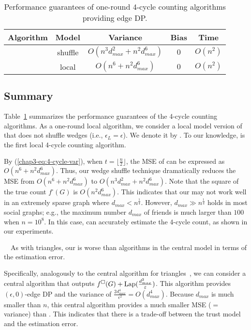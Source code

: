 \begin{table}[t]
  \caption{Performance guarantees of one-round 4-cycle counting algorithms providing edge DP.
  }
  
  \centering
  \begin{tabular}{|l|c|c|c|c|}
    \hline
    Algorithm & Model & Variance & Bias & Time \\ \hline
    \AlgWSCyc{} & shuffle & $O(n^3 d_{max}^2 + n^2 d_{max}^6)$ & $0$ & $O(n^2)$ \\ \hline
    \AlgWLCyc{} & local & $O(n^6 + n^2 d_{max}^6)$ & $0$ & $O(n^2)$ \\ \hline
  \end{tabular}
  \label{chap3-tab:upper_bounds_4cycle}
\end{table}

\subsection{Summary}
\label{chap3-sub:summary_4cycle}
Table~\ref{chap3-tab:upper_bounds_4cycle} summarizes the performance guarantees of the 4-cycle counting algorithms. 
As a one-round local algorithm, we consider a local model version of \AlgWSCyc{} that does not shuffle wedges (i.e., $\epsilon_L = \epsilon$). 
We denote it by \AlgWLCyc{}. 
To our knowledge, \AlgWLCyc{} is the first local 4-cycle counting algorithm. 

By (\ref{chap3-eq:4-cycle-var}), when $t = \lfloor \frac{n}{2} \rfloor$, the MSE of \AlgWLCyc{} can be expressed as $O(n^6 + n^2 d_{max}^6)$. 
Thus, our wedge shuffle technique dramatically reduces the MSE from $O(n^6 + n^2 d_{max}^6)$ to $O(n^3 d_{max}^2 + n^2 d_{max}^6)$. 
Note that the square of the true count $f^\square(G)$ is $O(n^2 d_{max}^6)$. 
This indicates that our \AlgWSCyc{} may not work well in an extremely sparse graph where $d_{max} < n^{\frac{1}{4}}$. 
However, $d_{max} \gg n^{\frac{1}{4}}$ holds in most social graphs; e.g., the maximum number $d_{max}$ of friends is much larger than $100$ when $n=10^8$. 
In this case, \AlgWSCyc{} can accurately estimate the 4-cycle count, as shown in our experiments. 

\smallskip
{}~~As with triangles, our \AlgWSCyc{} is worse than algorithms in the central model in terms of the estimation error. 

Specifically, 
analogously to the central algorithm for triangles~\cite{Imola_USENIX21}, 
we can consider a central algorithm that outputs $f^\square(G) + \textrm{Lap}(\frac{d_{max}^2}{\varepsilon})$. 
This algorithm provides 
$(\epsilon, 0)$-edge DP and the variance of $\frac{2d_{max}^4}{\epsilon^2} = O(d_{max}^4)$. 
Because $d_{max}$ is much smaller than $n$, this central algorithm provides a much smaller MSE ($=$ variance) than \AlgWSCyc{}. 
This indicates 
that there is a trade-off between the trust model and the estimation error. 

